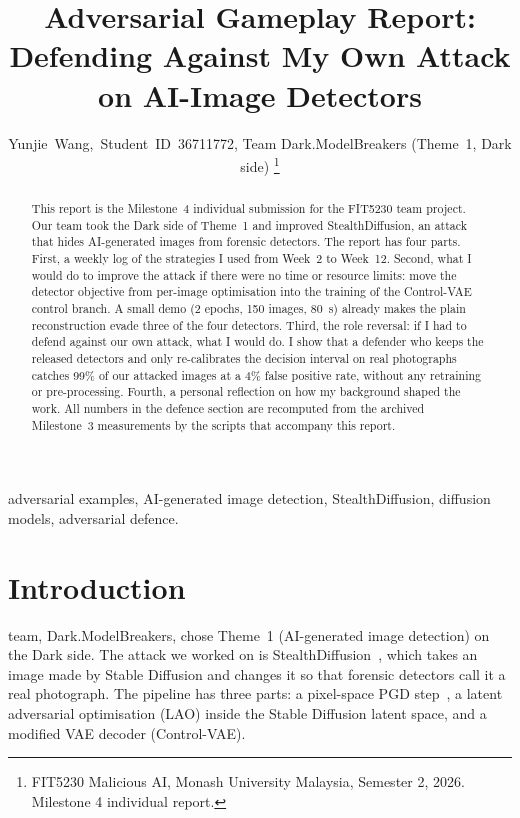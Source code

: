 \documentclass[journal]{IEEEtran}
\begin{document}
\title{Adversarial Gameplay Report: Defending Against My Own Attack on AI-Image Detectors}

\author{Yunjie~Wang,~Student~ID~36711772, Team Dark.ModelBreakers (Theme~1, Dark side)%
\thanks{FIT5230 Malicious AI, Monash University Malaysia, Semester 2, 2026. Milestone 4 individual report.}}


\maketitle

\begin{abstract}
This report is the Milestone~4 individual submission for the FIT5230 team project. Our team took the Dark side of Theme~1 and improved StealthDiffusion, an attack that hides AI-generated images from forensic detectors. The report has four parts. First, a weekly log of the strategies I used from Week~2 to Week~12. Second, what I would do to improve the attack if there were no time or resource limits: move the detector objective from per-image optimisation into the training of the Control-VAE control branch. A small demo (2 epochs, 150 images, 80~s) already makes the plain reconstruction evade three of the four detectors. Third, the role reversal: if I had to defend against our own attack, what I would do. I show that a defender who keeps the released detectors and only re-calibrates the decision interval on real photographs catches 99\% of our attacked images at a 4\% false positive rate, without any retraining or pre-processing. Fourth, a personal reflection on how my background shaped the work. All numbers in the defence section are recomputed from the archived Milestone~3 measurements by the scripts that accompany this report.
\end{abstract}

\begin{IEEEkeywords}
adversarial examples, AI-generated image detection, StealthDiffusion, diffusion models, adversarial defence.
\end{IEEEkeywords}

\section{Introduction}
\label{sec:intro}

 team, Dark.ModelBreakers, chose Theme~1 (AI-generated image detection) on the Dark side. The attack we worked on is StealthDiffusion~\cite{zhou2024stealthdiffusion}, which takes an image made by Stable Diffusion and changes it so that forensic detectors call it a real photograph. The pipeline has three parts: a pixel-space PGD step~\cite{madry2018pgd}, a latent adversarial optimisation (LAO) inside the Stable Diffusion latent space, and a modified VAE decoder (Control-VAE).
\end{document}
